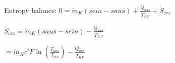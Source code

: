Entropy balance:  
\( 0 = \dot{m}_K (sein - saus) + \frac{\dot{Q}_{aus}}{\bar{T}_{KF}} + \dot{S}_{erz} \)  

\( \dot{S}_{erz} = \dot{m}_K (saus - sein) - \frac{\dot{Q}_{aus}}{\bar{T}_{KF}} \)  

\( = \dot{m}_K c^i F \ln \left( \frac{T_{aus}}{T_{ein}} \right) - \frac{\dot{Q}_{aus}}{\bar{T}_{KF}} \)